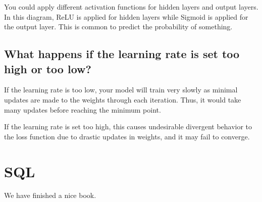 \documentclass[
]{book}
\begin{document}
You could apply different activation functions for hidden layers and output layers. In this diagram, ReLU is applied for hidden layers while Sigmoid is applied for the output layer. This is common to predict the probability of something.

\hypertarget{what-happens-if-the-learning-rate-is-set-too-high-or-too-low}{%
\section{What happens if the learning rate is set too high or too low?}\label{what-happens-if-the-learning-rate-is-set-too-high-or-too-low}}

If the learning rate is too low, your model will train very slowly as minimal updates are made to the weights through each iteration. Thus, it would take many updates before reaching the minimum point.

If the learning rate is set too high, this causes undesirable divergent behavior to the loss function due to drastic updates in weights, and it may fail to converge.

\hypertarget{sql}{%
\chapter{SQL}\label{sql}}

We have finished a nice book.

  
\end{document}
